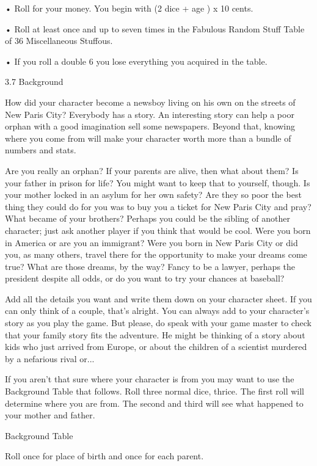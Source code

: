 • Roll for your money. You begin with (2 dice + age ) x 10 cents.

• Roll at least once and up to seven times in the Fabulous Random Stuff Table of 36 Miscellaneous Stuffous.

• If you roll a double 6 you lose everything you acquired in the table.

3.7 Background

How did your character become a newsboy living on his own on the streets of New Paris City? Everybody has a story. An interesting story can help a poor orphan with a good imagination sell some newspapers. Beyond that, knowing where you come from will make your character worth more than a bundle of numbers and stats.

Are you really an orphan? If your parents are alive, then what about them? Is your father in prison for life? You might want to keep that to yourself, though. Is your mother locked in an asylum for her own safety? Are they so poor the best thing they could do for you was to buy you a ticket for New Paris City and pray? What became of your brothers? Perhaps you could be the sibling of another character; just ask another player if you think that would be cool. Were you born in America or are you an immigrant? Were you born in New Paris City or did you, as many others, travel there for the opportunity to make your dreams come true? What are those dreams, by the way? Fancy to be a lawyer, perhaps the president despite all odds, or do you want to try your chances at baseball?

Add all the details you want and write them down on your character sheet. If you can only think of a couple, that's alright. You can always add to your character's story as you play the game. But please, do speak with your game master to check that your family story fits the adventure. He might be thinking of a story about kids who just arrived from Europe, or about the children of a scientist murdered by a nefarious rival or...

If you aren't that sure where your character is from you may want to use the Background Table that follows. Roll three normal dice, thrice. The first roll will determine where you are from. The second and third will see what happened to your mother and father.

Background Table



          



Roll once for place of birth and once for each parent.

